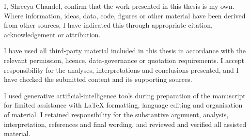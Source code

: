 I, Shreeya Chandel, confirm that the work presented in this thesis is my own. Where information, ideas, data, code, figures or other material have been derived from other sources, I have indicated this through appropriate citation, acknowledgement or attribution.

I have used all third-party material included in this thesis in accordance with the relevant permission, licence, data-governance or quotation requirements. I accept responsibility for the analyses, interpretations and conclusions presented, and I have checked the submitted content and its supporting sources.

I used generative artificial-intelligence tools during preparation of the manuscript for limited assistance with LaTeX formatting, language editing and organisation of material. I retained responsibility for the substantive argument, analysis, interpretation, references and final wording, and reviewed and verified all assisted material.
